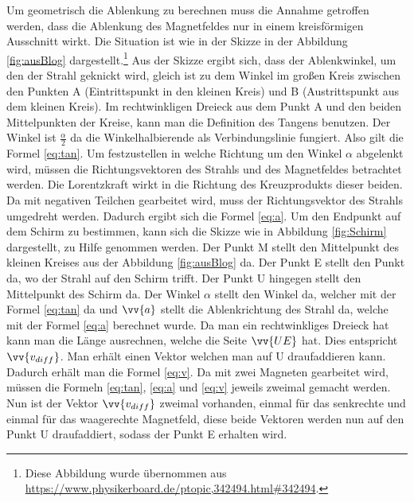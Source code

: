 Um geometrisch die Ablenkung zu berechnen muss die Annahme getroffen werden, dass die Ablenkung des Magnetfeldes nur in einem kreisförmigen Ausschnitt wirkt.
Die Situation ist wie in der Skizze in der Abbildung \ref{fig:ausBlog} dargestellt.\footnote{Diese Abbildung wurde übernommen aus \url{https://www.physikerboard.de/ptopic,342494.html#342494}.}
Aus der Skizze ergibt sich, dass der Ablenkwinkel, um den der Strahl geknickt wird, gleich ist zu dem Winkel im großen Kreis zwischen den Punkten A (Eintrittspunkt in den kleinen Kreis) und B (Austrittspunkt aus dem kleinen Kreis).
Im rechtwinkligen Dreieck aus dem Punkt A und den beiden Mittelpunkten der Kreise, kann man die Definition des Tangens benutzen.
Der Winkel ist $\frac{\alpha}{2}$ da die Winkelhalbierende als Verbindungslinie fungiert.
Also gilt die Formel \ref{eq:tan}.
Um festzustellen in welche Richtung um den Winkel $\alpha$ abgelenkt wird, müssen die Richtungsvektoren des Strahls und des Magnetfeldes betrachtet werden.
Die Lorentzkraft wirkt in die Richtung des Kreuzprodukts dieser beiden.
Da mit negativen Teilchen gearbeitet wird, muss der Richtungsvektor des Strahls umgedreht werden. Dadurch ergibt sich die Formel \ref{eq:a}.
Um den Endpunkt auf dem Schirm zu bestimmen, kann sich die Skizze wie in Abbildung \ref{fig:Schirm} dargestellt, zu Hilfe genommen werden.
Der Punkt M stellt den Mittelpunkt des kleinen Kreises aus der Abbildung \ref{fig:ausBlog} da.
Der Punkt E stellt den Punkt da, wo der Strahl auf den Schirm trifft. Der Punkt U hingegen stellt den Mittelpunkt des Schirm da.
Der Winkel $\alpha$ stellt den Winkel da, welcher mit der Formel \ref{eq:tan} da und $\vv{a}$ stellt die Ablenkrichtung des Strahl da, welche mit der Formel \ref{eq:a} berechnet wurde.
Da man ein rechtwinkliges Dreieck hat kann man die Länge ausrechnen, welche die Seite $\vv{UE}$ hat.
Dies entspricht $\vv{v_{diff}}$.
Man erhält einen Vektor welchen man auf U draufaddieren kann.
Dadurch erhält man die Formel \ref{eq:v}.
Da mit zwei Magneten gearbeitet wird, müssen die Formeln \ref{eq:tan}, \ref{eq:a} und \ref{eq:v} jeweils zweimal gemacht werden.
Nun ist der Vektor $\vv{v_{diff}}$ zweimal vorhanden, einmal für das senkrechte und einmal für das waagerechte Magnetfeld, diese beide Vektoren werden nun auf den Punkt U draufaddiert, sodass der Punkt E erhalten wird.
